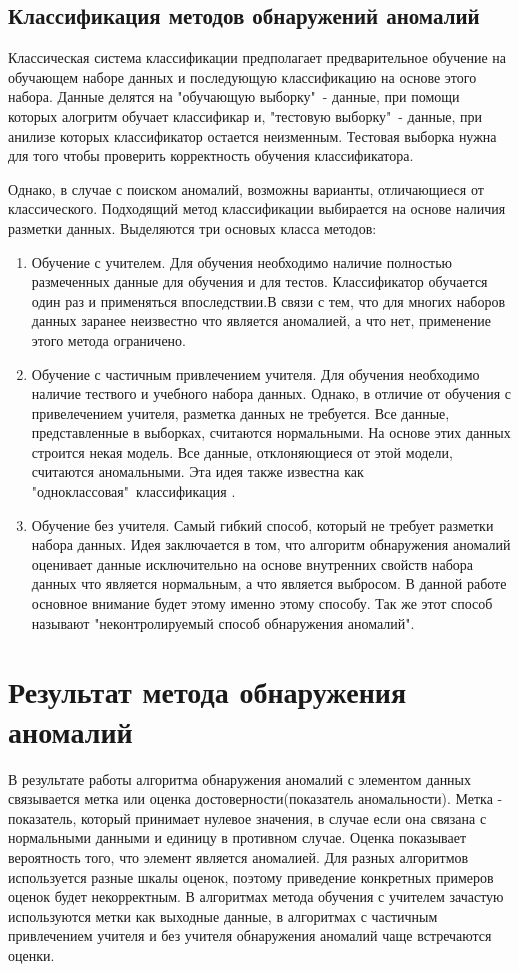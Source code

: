 \subsection{Классификация методов обнаружений аномалий}
Классическая система классификации предполагает предварительное обучение на обучающем наборе данных и последующую классификацию на основе этого набора. Данные делятся на "обучающую выборку"\ - данные, при помощи которых алогритм обучает классификар и, "тестовую выборку"\ - данные, при анилизе которых классификатор остается неизменным. Тестовая выборка нужна для того чтобы проверить корректность обучения классификатора.

 Однако, в случае с поиском аномалий, возможны варианты, отличающиеся от классического. Подходящий метод классификации выбирается на основе наличия разметки данных.   Выделяются три основых класса методов:
\begin{enumerate}
\item Обучение с учителем. Для обучения необходимо наличие полностью  размеченных данные для обучения и для тестов. Классификатор  обучается один раз и применяться впоследствии.В связи с тем, что для многих наборов данных заранее неизвестно что является аномалией, а что нет, применение этого метода ограничено.
\item Обучение с частичным привлечением учителя. Для обучения необходимо наличие тествого и учебного набора данных. Однако, в отличие от обучения с привелечением учителя, разметка данных не требуется. Все данные, представленные в выборках, считаются нормальными. На основе этих данных строится некая модель. Все данные, отклоняющиеся от этой модели, считаются аномальными. Эта идея также известна как "одноклассовая"\ классификация \cite{Book03}.
\item Обучение без учителя.
Самый гибкий способ, который не требует разметки набора данных.  Идея заключается в том, что алгоритм обнаружения аномалий оценивает данные исключительно на основе внутренних свойств набора данных что является нормальным, а что является выбросом. В данной работе основное внимание будет этому  именно этому способу. Так же этот способ называют "неконтролируемый способ обнаружения  аномалий".
\end{enumerate}

\section{Результат метода обнаружения аномалий}
В результате работы алгоритма обнаружения аномалий  с элементом данных связывается  метка или оценка достоверности(показатель аномальности).  Метка - показатель, который принимает нулевое значения, в случае если она связана с нормальными данными и единицу в противном случае. Оценка показывает вероятность того, что элемент является аномалией. Для разных алгоритмов используется разные шкалы оценок, поэтому приведение конкретных примеров оценок будет некорректным.  В алгоритмах метода обучения с учителем зачастую используются метки как выходные данные, в  алгоритмах  с частичным привлечением учителя и без учителя  обнаружения аномалий чаще встречаются оценки.
